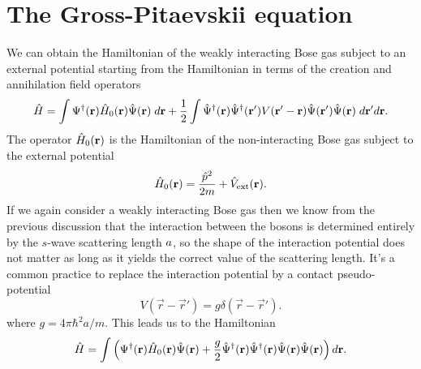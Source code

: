 \section{The Gross-Pitaevskii equation}

We can obtain the Hamiltonian of the weakly interacting Bose gas subject to an external potential starting from the
Hamiltonian in terms of the creation and annihilation field operators
%
\begin{equation}
    \label{eq:hamiltonian-full-second-quant}
    {\hat{H}} = \int {\Psi}^\dagger(\mathbf r) {\hat{H}}_0(\mathbf r) {\hat{\Psi}}(\mathbf r) \; d\mathbf r +
    \frac{1}{2} \int {\hat{\Psi}}^\dagger(\mathbf r) {\hat{\Psi}}^\dagger(\mathbf r')  V(\mathbf r' - \mathbf r) {\hat{\Psi}}(\mathbf r') {\hat{\Psi}}(\mathbf r) \; d \mathbf r' d \mathbf r.
\end{equation}
%
The operator ${\hat{H}}_0(\mathbf r)$ is the Hamiltonian of the non-interacting
Bose gas subject to the external potential
%
\begin{equation}
	\label{eq:non-interacting-hamiltonian}
    {\hat{H}}_0(\mathbf r) = \frac{{\hat{p}}^2}{2m} + {\hat{V}}_\mathrm{ext}(\mathbf r).
\end{equation}
%
If we again consider a weakly interacting Bose gas then we know from the previous discussion that the interaction between the bosons is determined entirely by the $s$-wave scattering length $a$, so the shape of the interaction
potential does not matter as long as it yields the correct value of the scattering length. It's a common practice to
replace the interaction potential by a contact pseudo-potential
%
\begin{equation}
    V(\vec r - \vec r') = g \delta(\vec r - \vec r').
\end{equation}
%
where $g = 4 \pi \hbar^2 a / m$. This leads us to the Hamiltonian
%
\begin{equation}
	\label{eq:pseudo-potential-hamiltonian}
    {\hat{H}} = \int \left({\Psi}^\dagger(\mathbf r) {\hat{H}}_0(\mathbf r) {\hat{\Psi}}(\mathbf r) +
    \frac{g}{2} {\hat{\Psi}}^\dagger(\mathbf r) {\hat{\Psi}}^\dagger(\mathbf r) {\hat{\Psi}}(\mathbf r) {\hat{\Psi}}(\mathbf r)\right)  d \mathbf r.
\end{equation}

